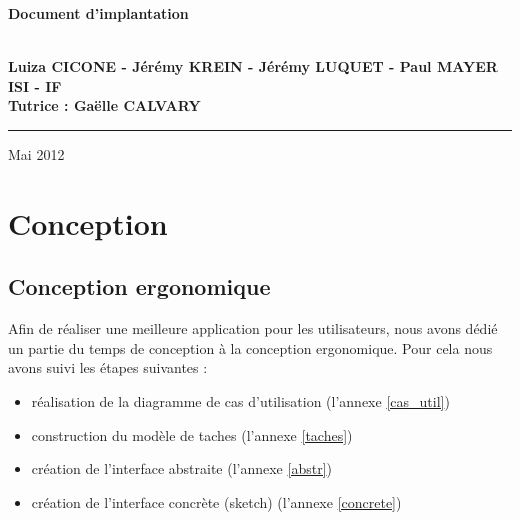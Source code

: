 \documentclass[a4paper, 11px]{article}
\begin{document}
\begin{titlepage}
\begin{center}
\begin{center}
{\Huge \bf Document d'implantation}


\end{center}


\vspace{1cm}

\begin{center}
$ $\\
\large{ \textbf{Luiza CICONE - Jérémy KREIN - Jérémy LUQUET - Paul MAYER}}\\
\large{ \textbf{ISI - IF}}\\
\large{ \textbf{Tutrice : Gaëlle CALVARY}}
$ $\\
\end{center}
\rule{\linewidth}{.5pt}


\vfill


{\large Mai 2012}

\end{center}
\end{titlepage}

\tableofcontents

\newpage

\section {Conception}
\subsection{Conception ergonomique}

Afin de réaliser une meilleure application pour les utilisateurs, nous avons dédié un partie du temps de conception à la conception ergonomique. Pour cela nous avons suivi les étapes suivantes :\\
\begin {itemize}

\item réalisation de la diagramme de cas d'utilisation (l'annexe \ref{cas_util})\\
\item construction du modèle de taches (l'annexe \ref{taches})\\
\item création de l'interface abstraite (l'annexe \ref{abstr})\\
\item création de l'interface concrète (sketch) (l'annexe \ref{concrete})\\
\end{itemize}
\end{document}
